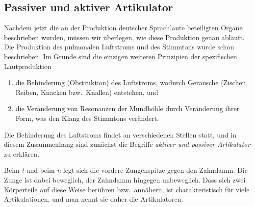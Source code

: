 \label{sec:artikulationsart}

\subsection{Passiver und aktiver Artikulator}

\label{sec:artikulator}

Nachdem jetzt die an der Produktion deutscher Sprachlaute beteiligten Organe beschrieben wurden, müssen wir überlegen, wie diese Produktion genau abläuft.
Die Produktion des pulmonalen Luftstroms und des Stimmtons wurde schon beschrieben.
Im Grunde sind die einzigen weiteren Prinzipien der spezifischen Lautproduktion

\begin{enumerate}\Lf
  \item die Behinderung (Obstruktion) des Luftstroms, wodurch Geräusche (Zischen, Reiben, Knacken bzw.\ Knallen) entstehen, und
  \item die Veränderung von Resonanzen der Mundhöhle durch Veränderung ihrer Form, was den Klang des Stimmtons verändert.
\end{enumerate}

Die Behinderung des Luftstroms findet an verschiedenen Stellen statt, und in diesem Zusammenhang sind zunächst die Begriffe \textit{aktiver und passiver Artikulator} zu erklären.


Beim \textit{t} und beim \textit{n} legt sich die vordere Zungenspitze gegen den Zahndamm.
Die Zunge ist dabei beweglich, der Zahndamm hingegen unbeweglich.
Dass sich zwei Körperteile auf diese Weise berühren bzw.\ annähern, ist charakteristisch für viele Artikulationen, und man nennt sie daher die Artikulatoren.


